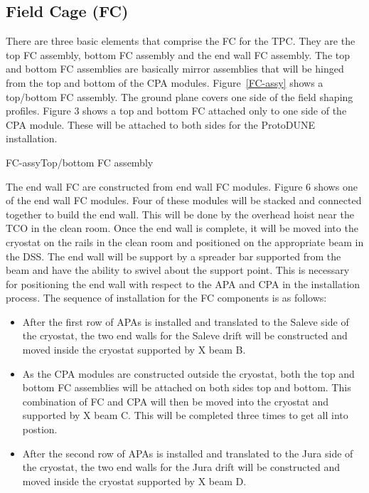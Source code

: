 \subsection{Field Cage (FC)}


There are three basic elements that comprise the FC for the TPC.  They are the top FC assembly, bottom FC assembly and the end wall FC assembly.  The top and bottom FC assemblies are basically mirror assemblies that will be hinged from the top and bottom of the CPA modules.  Figure~\ref{FC-assy} shows a top/bottom FC assembly.  The ground plane covers one side of the field shaping profiles.  Figure 3 shows a top and bottom FC attached only to one side of the CPA module.  These will be attached to both sides for the ProtoDUNE installation.  

\begin{cdrfigure}{FC-assy}{Top/bottom FC assembly }
\end{cdrfigure}

The end wall FC are constructed from end wall FC modules.  Figure 6 shows one of the end wall FC modules.  Four of these modules will be stacked and connected together to build the end wall.  This will be done by the overhead hoist near the TCO in the clean room.  Once the end wall is complete, it will be moved into the cryostat on the rails in the clean room and positioned on the appropriate beam in the DSS.  The end wall will be support by a spreader bar supported from the beam and have the ability to swivel about the support point.  This is necessary for positioning the end wall with respect to the APA and CPA in the installation process.  
The sequence of installation for the FC components is as follows:
\begin{itemize}
\item After the first row of APAs is installed and translated to the Saleve side of the cryostat, the two end walls for the Saleve drift will be constructed and moved inside the cryostat supported by X beam B.  
\item As the CPA modules are constructed outside the cryostat, both the top and bottom FC assemblies will be attached on both sides top and bottom.  This combination of FC and CPA will then be moved into the cryostat and supported by X beam C.  This will be completed three times to get all into postion.
\item After the second row of APAs is installed and translated to the Jura side of the cryostat, the two end walls for the Jura drift will be constructed and moved inside the cryostat supported by X beam D.  
\end{itemize}

